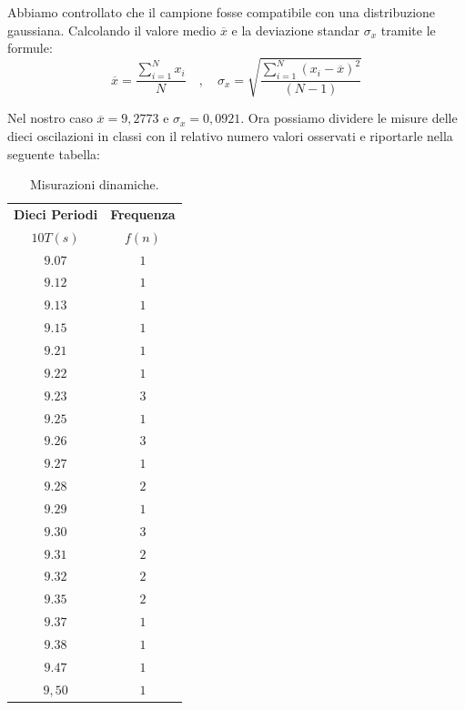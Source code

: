 \documentclass[12pt, a4paper]{article}
\begin{document}
Abbiamo controllato che il campione fosse compatibile con una distribuzione gaussiana.
Calcolando il valore medio $\overline{x}$ e la deviazione standar $\sigma_x$ tramite le formule: 
\begin{equation}
    \overline{x} = \frac{\sum_{i=1}^{N}x_i}{N} \quad , \quad
    \sigma_x = \sqrt{\frac{\sum_{i=1}^{N}(x_i-\overline{x})^2}{(N-1)}}
\end{equation}

\smallskip
Nel nostro caso $\overline{x} = 9,2773$ e $\sigma_x = 0,0921 $. 
Ora possiamo dividere le misure delle dieci oscilazioni in classi con il relativo numero valori osservati e riportarle  nella seguente tabella: 


\begin{table}[hbt!]
    \centering
    {\renewcommand\arraystretch{1.0} 
    \begin{tabular}{|c|c|}
    \hline
        \textbf{Dieci Periodi} & \textbf{Frequenza}\\
        $10T(s)$ & $f(n)$\\
    \hline
    $ 9.07 $ & $ 1 $ \\ 
    $ 9.12 $ & $ 1 $ \\
    $ 9.13 $ & $ 1 $ \\
    $ 9.15 $ & $ 1 $ \\ 
    $ 9.21 $ & $ 1 $ \\
    $ 9.22 $ & $ 1 $ \\
    $ 9.23 $ & $ 3 $ \\
    $ 9.25 $ & $ 1 $ \\
    $ 9.26 $ & $ 3 $ \\
    $ 9.27 $ & $ 1 $ \\
    $ 9.28 $ & $ 2 $ \\
    $ 9.29 $ & $ 1 $ \\
    $ 9.30 $ & $ 3 $ \\ 
    $ 9.31 $ & $ 2 $ \\
    $ 9.32 $ & $ 2 $ \\
    $ 9.35 $ & $ 2 $ \\
    $ 9.37 $ & $ 1 $ \\
    $ 9.38 $ & $ 1 $ \\
    $ 9.47 $ & $ 1 $ \\
    $ 9,50 $ & $ 1 $ \\ 
    \hline
    \end{tabular}}
    \caption{Misurazioni dinamiche.}
    \label{tab: Misure Dinamiche}
\end{table}
\end{document}
